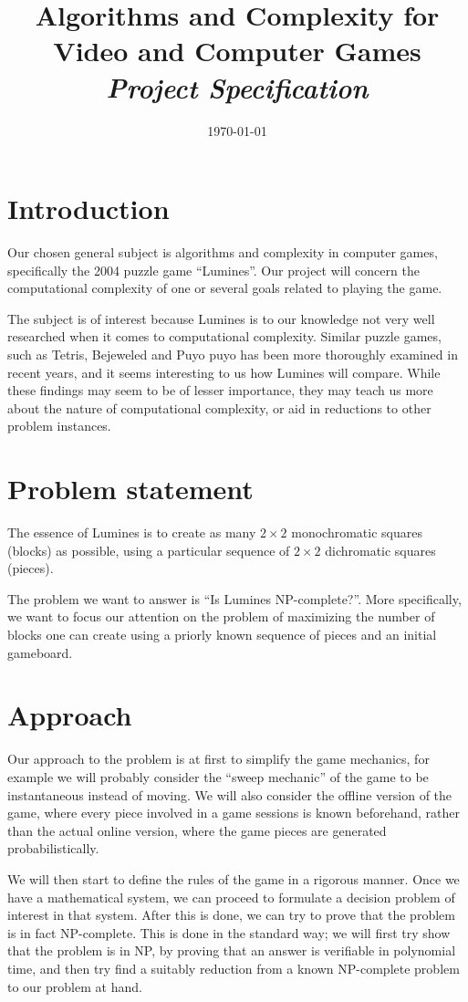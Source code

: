 \documentclass[a4paper,10pt]{article}
\title{Algorithms and Complexity for Video and Computer Games \\
    \textit{Project Specification}} %
\author{\cauthor} %
\date{\today} %
\begin{document}
\maketitle %

\section{Introduction}
Our chosen general subject is algorithms and complexity in computer games, specifically the 2004 puzzle game ``Lumines''. Our project will concern the computational complexity of one or several goals related to playing the game.

The subject is of interest because Lumines is to our knowledge not very well researched when it comes to computational complexity. Similar puzzle games, such as Tetris, Bejeweled and Puyo puyo has been more thoroughly examined in recent years, and it seems interesting to us how Lumines will compare. While these findings may seem to be of lesser importance, they may teach us more about the nature of computational complexity, or aid in reductions to other problem instances.

\section{Problem statement}
The essence of Lumines is to create as many $2 \times 2$ monochromatic squares (blocks) as possible, using a particular sequence of $2 \times 2$ dichromatic squares (pieces).

The problem we want to answer is ``Is Lumines NP-complete?''. More specifically, we want to focus our attention on the problem of maximizing the number of blocks one can create using a priorly known sequence of pieces and an initial gameboard. 

\section{Approach}
Our approach to the problem is at first to simplify the game mechanics, for example we will probably consider the ``sweep mechanic'' of the game to be instantaneous instead of moving. We will also consider the offline version of the game, where every piece involved in a game sessions is known beforehand, rather than the actual online version, where the game pieces are generated probabilistically.

We will then start to define the rules of the game in a rigorous manner. Once we have a mathematical system, we can proceed to formulate a decision problem of interest in that system. After this is done, we can try to prove that the problem is in fact NP-complete. This is done in the standard way; we will first try show that the problem is in NP, by proving that an answer is verifiable in polynomial time, and then try find a suitably reduction from a known NP-complete problem to our problem at hand.
\end{document}
